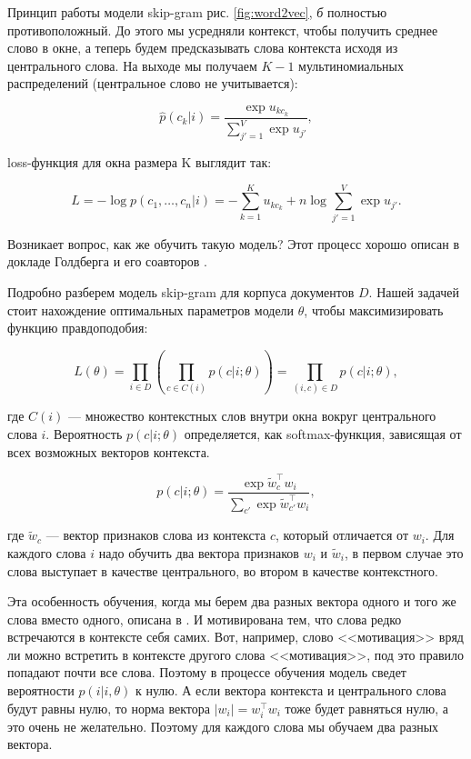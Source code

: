 Принцип работы модели skip-gram рис. \ref{fig:word2vec}, \textit{б} полностью противоположный. До этого мы
усредняли контекст, чтобы получить среднее слово в окне, а теперь будем предсказывать слова контекста исходя
из центрального слова. На выходе мы получаем $K-1$ мультиномиальных распределений (центральное слово не
учитывается):

\begin{equation}
 \hat{p}(c_k|i) = \frac{\exp{u_{kc_k}}}{\sum_{j'=1}^V \exp{u_{j'}}},
\end{equation}

loss-функция для окна размера K выглядит так:

\begin{equation}
 L = -\log{p(c_1, \ldots, c_n|i)} = - \sum_{k=1}^{K} u_{kc_k} + n\log{\sum_{j'=1}^{V} \exp{u_{j'}}}.
\end{equation}

Возникает вопрос, как же обучить такую модель? Этот процесс хорошо описан в докладе Голдберга и его соавторов
\cite{Goldberg}.

\bigskip
Подробно разберем модель skip-gram для корпуса документов $D$. Нашей задачей стоит нахождение оптимальных
параметров модели $\theta$, чтобы максимизировать функцию правдоподобия:

\begin{equation} \label{eq:likelyhood}
 L(\theta)=\prod_{i\in D}\left(\prod_{c\in C(i)} p(c|i;\theta)\right) = \prod_{(i,c)\in D}p(c|i;\theta),
\end{equation}

где $C(i)$ --- множество контекстных слов внутри окна вокруг центрального слова $i$. Вероятность $p(c|i;\theta
)$ определяется, как softmax-функция, зависящая от всех возможных векторов контекста.

\begin{equation} \label{eq:generalSoftmax}
 p(c|i;\theta) = \frac{\exp{\tilde{w}_c^\top w_i}}{\sum_{c'} \exp{\tilde{w}_{c'}^\top w_i}},
\end{equation}

где $\tilde{w}_c$ --- вектор признаков слова из контекста $c$, который отличается от $w_i$. Для каждого слова
$i$ надо обучить два вектора признаков $w_i$ и $\tilde{w}_i$, в первом случае это слова выступает в качестве
центрального, во втором в качестве контекстного.

\bigskip
Эта особенность обучения, когда мы берем два разных вектора одного и того же слова вместо одного, описана в
\cite{Goldberg}. И мотивирована тем, что слова редко встречаются в контексте себя самих. Вот, например, слово
<<мотивация>> вряд ли можно встретить в контексте другого слова <<мотивация>>, под это правило попадают почти
все слова. Поэтому в процессе обучения модель сведет вероятности $p(i|i, \theta)$ к нулю. А если вектора
контекста и центрального слова будут равны нулю, то норма вектора $|w_i| = w_i^\top w_i$ тоже будет равняться
нулю, а это очень не желательно. Поэтому для каждого слова мы обучаем два разных вектора.

